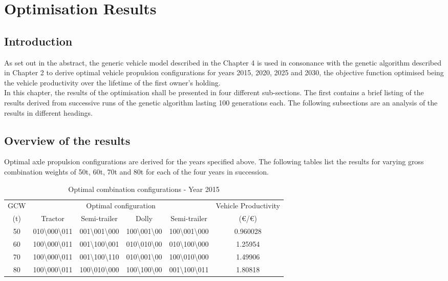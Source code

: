 \documentclass[ExampleMasters.tex]{subfiles}
\begin{document}
\chapter{Optimisation Results}

\section{Introduction}
As set out in the abstract, the generic vehicle model described in the Chapter 4 is used in consonance with the genetic algorithm described in Chapter 2 to derive optimal vehicle propulsion configurations for years 2015, 2020, 2025 and 2030, the objective function optimised being the vehicle productivity over the lifetime of the first owner's holding.\\

In this chapter, the results of the optimisation shall be presented in four different sub-sections. The first contains a brief listing of the results derived from successive runs of the genetic algorithm lasting 100 generations each. The following subsections are an analysis of the results in different headings.

\section{Overview of the results}
Optimal axle propulsion configurations are derived for the years specified above. The following tables list the results for varying gross combination weights of 50t, 60t, 70t and 80t for each of the four years in succession.

\begin{table}[ht]
\caption{Optimal combination configurations - Year 2015}
\centering
\begin{tabular}{c c c c c c}
\hline\hline
GCW & \multicolumn{4}{c}{Optimal configuration} & Vehicle Productivity \\ \cline{2-5}
(t) & Tractor & Semi-trailer & Dolly & Semi-trailer & (\euro/\euro)\\ 
\hline
50 & 010\textbackslash000\textbackslash011 &
	 001\textbackslash001\textbackslash000 & 100\textbackslash001\textbackslash00 &
	 100\textbackslash001\textbackslash000 & 0.960028 \\
60 & 100\textbackslash000\textbackslash011 &
	 001\textbackslash100\textbackslash001 & 010\textbackslash010\textbackslash00 &
	 010\textbackslash100\textbackslash000 & 1.25954 \\
70 & 100\textbackslash000\textbackslash011 & 
	 001\textbackslash100\textbackslash110 & 010\textbackslash001\textbackslash00  & 
	 100\textbackslash010\textbackslash000 & 1.49906 \\
80 & 100\textbackslash000\textbackslash011 &
	 100\textbackslash010\textbackslash000 & 100\textbackslash100\textbackslash00 &
	 001\textbackslash100\textbackslash011 & 1.80818 \\
\hline
\end{tabular}
\label{table:optComb2015}
\end{table}
\end{document}
